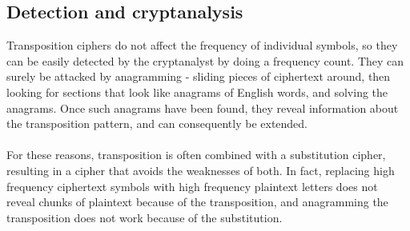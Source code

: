 \documentclass[Lau,binding=0.6cm,oneside]{sapthesis}
\begin{document}
\begin{appendices}
\section{Detection and cryptanalysis}
Transposition ciphers do not affect the frequency of individual symbols, so they can be easily detected by the cryptanalyst by doing a frequency count. They can surely be attacked by anagramming - sliding pieces of ciphertext around, then looking for sections that look like anagrams of English words, and solving the anagrams. Once such anagrams have been found, they reveal information about the transposition pattern, and can consequently be extended.\\\\
For these reasons, transposition is often combined with a substitution cipher, resulting in a cipher that avoids the weaknesses of both. In fact, replacing high frequency ciphertext symbols with high frequency plaintext letters does not reveal chunks of plaintext because of the transposition, and anagramming the transposition does not work because of the substitution.
\end{appendices}	

\backmatter

\printbibliography[title=References,heading=bibintoc]

\end{document}
